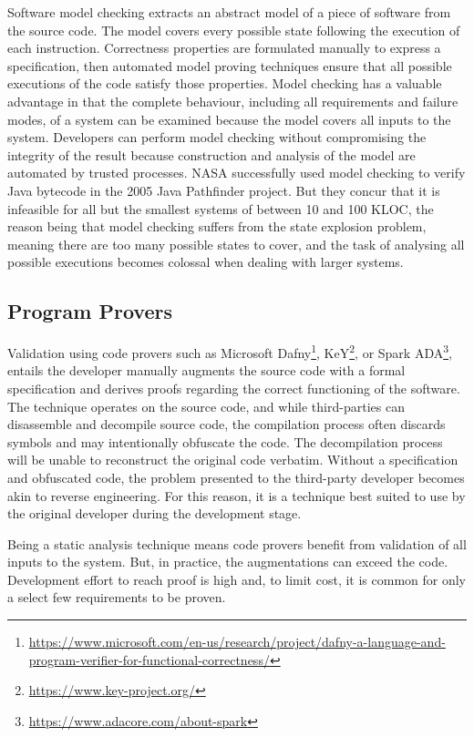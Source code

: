 Software model checking extracts an abstract model of a piece of software from the source code.  The model covers every possible state following the execution of each instruction.  Correctness properties are formulated manually to express a specification, then automated model proving techniques ensure that all possible executions of the code satisfy those properties.  Model checking has a valuable advantage in that the complete behaviour, including all requirements and failure modes, of a system can be examined because the model covers all inputs to the system.  Developers can perform model checking without compromising the integrity of the result because construction and analysis of the model are automated by trusted processes.  NASA successfully used model checking to verify Java bytecode in the 2005 Java Pathfinder \cite{JavaPathfinder} project.  But they concur that it is infeasible for all but the smallest systems of between 10 and 100 KLOC, the reason being that model checking suffers from the state explosion problem, meaning there are too many possible states to cover, and the task of analysing all possible executions becomes colossal when dealing with larger systems.

\subsection{Program Provers}
\label{subSec:ProgramProvers}

Validation using code provers such as Microsoft Dafny\footnote{\url{https://www.microsoft.com/en-us/research/project/dafny-a-language-and-program-verifier-for-functional-correctness/}}, KeY\footnote{\url{https://www.key-project.org/}}, or Spark ADA\footnote{\url{https://www.adacore.com/about-spark}}, entails the developer manually augments the source code with a formal specification and derives proofs regarding the correct functioning of the software.  The technique operates on the source code, and while third-parties can disassemble and decompile source code, the compilation process often discards symbols and may intentionally obfuscate the code.  The decompilation process will be unable to reconstruct the original code verbatim.  Without a specification and obfuscated code, the problem presented to the third-party developer becomes akin to reverse engineering.  For this reason, it is a technique best suited to use by the original developer during the development stage.

Being a static analysis technique means code provers benefit from validation of all inputs to the system.  But, in practice, the augmentations can exceed the code.  Development effort to reach proof is high and, to limit cost, it is common for only a select few requirements to be proven.\\

